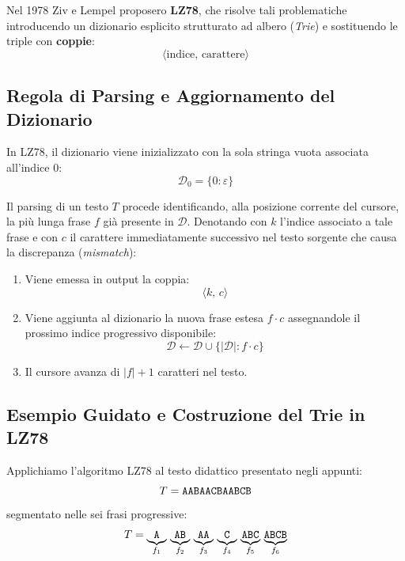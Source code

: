 Nel 1978 Ziv e Lempel proposero \textbf{LZ78}, che risolve tali problematiche introducendo un dizionario esplicito strutturato ad albero (\textit{Trie}) e sostituendo le triple con \textbf{coppie}:
\begin{equation}
  \langle \text{indice}, \, \text{carattere} \rangle
\end{equation}

\FloatBarrier
\subsection{Regola di Parsing e Aggiornamento del Dizionario}
\label{subsec:lz78-parsing-regola}

In LZ78, il dizionario viene inizializzato con la sola stringa vuota associata all'indice $0$:
\begin{equation}
  \mathcal{D}_0 = \{ 0: \varepsilon \}
\end{equation}

Il parsing di un testo $T$ procede identificando, alla posizione corrente del cursore, la pi\`u lunga frase $f$ gi\`a presente in $\mathcal{D}$. Denotando con $k$ l'indice associato a tale frase e con $c$ il carattere immediatamente successivo nel testo sorgente che causa la discrepanza (\textit{mismatch}):
\begin{enumerate}
  \item Viene emessa in output la coppia:
  \begin{equation}
    \langle k, \, c \rangle
  \end{equation}
  \item Viene aggiunta al dizionario la nuova frase estesa $f \cdot c$ assegnandole il prossimo indice progressivo disponibile:
  \begin{equation}
    \mathcal{D} \leftarrow \mathcal{D} \cup \{ \vert \mathcal{D} \vert : f \cdot c \}
  \end{equation}
  \item Il cursore avanza di $\vert f \vert + 1$ caratteri nel testo.
\end{enumerate}

\FloatBarrier
\subsection{Esempio Guidato e Costruzione del Trie in LZ78}
\label{subsec:lz78-esempio-trie}

Applichiamo l'algoritmo LZ78 al testo didattico presentato negli appunti:
\begin{equation}
  T = \text{\texttt{AABAACBAABCB}}
\end{equation}
segmentato nelle sei frasi progressive:
\begin{equation}
  T = \underbrace{\text{\texttt{A}}}_{f_1} \, \underbrace{\text{\texttt{AB}}}_{f_2} \, \underbrace{\text{\texttt{AA}}}_{f_3} \, \underbrace{\text{\texttt{C}}}_{f_4} \, \underbrace{\text{\texttt{ABC}}}_{f_5} \, \underbrace{\text{\texttt{ABCB}}}_{f_6}
\end{equation}

